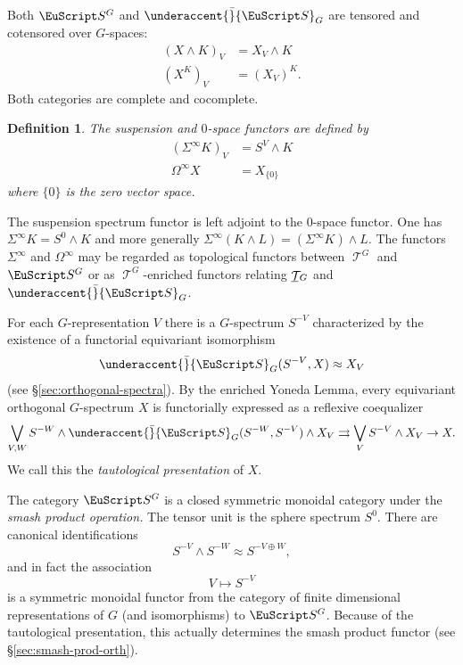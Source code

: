\documentclass{amsart}
\newtheorem{definition}[equation]{Definition}
\newenvironment{defin}{\begin{definition}\rm}{\end{definition}}
\theoremstyle{definition}
\newtheorem{defin}[equation]{Definition}
\theoremstyle{remark}
\newcommand{\spectra}{\EuScript S}
\DeclareMathOperator{\spaces}{\mathcal T}
\newcommand{\gspaces}[1]{\underline{\spaces\mkern-4mu}\mkern4mu_{\!#1}}
\newcommand{\ugspaces}[1]{\spaces^{#1}}
\newcommand{\gspectra}[1]{\underaccent{\bar}{\spectra}_{#1}}
\newcommand{\ugspectra}[1]{\spectra^{#1}}
\begin{document}
Both $\ugspectra{G}$ and $\gspectra{G}$ are tensored and cotensored
over $G$-spaces:
\begin{align*}
(X\wedge K)_{V} &= X_{V}\wedge K \\
\left(X^{K} \right)_{V} &= (X_{V})^{K}.
\end{align*}
Both categories are complete and cocomplete.

\begin{defin}
\label{def:6} The {\em suspension} and {\em $0$-space} functors are
defined by
\begin{align*}
(\Sigma^{\infty}K)_{V} &=S^{V}\wedge K \\
\Omega^{\infty}X &= X_{\{0\}}
\end{align*}
where $\{0 \}$ is the zero vector space.
\end{defin}

The suspension spectrum functor is left adjoint to the $0$-space
functor.  One has $\Sigma^{\infty}K = S^{0}\wedge K$ and more
generally $\Sigma^{\infty}(K\wedge L) = \left(\Sigma^\infty
K\right)\wedge L$.  The functors $\Sigma^{\infty}$ and
$\Omega^{\infty}$ may be regarded as topological functors between
$\ugspaces{G}$ and $\ugspectra{G}$ or as $\ugspaces{G}$-enriched
functors relating $\gspaces{G}$ and $\gspectra{G}$.

For each $G$-representation $V$ there is a $G$-spectrum $S^{-V}$
characterized by the existence of a functorial equivariant isomorphism
\begin{equation}
\label{eq:167}
\gspectra{G}(S^{-V},X) \approx X_{V}
\end{equation}
(see \S\ref{sec:orthogonal-spectra}).  By the enriched Yoneda Lemma,
every equivariant orthogonal $G$-spectrum $X$ is functorially
expressed as a reflexive coequalizer
\begin{equation}
\bigvee_{V,W} S^{-W}\wedge \gspectra{G}(S^{-W},S^{-V})\wedge
X_{V}\rightrightarrows
\bigvee_{V} S^{-V}\wedge X_{V} \to X.
\end{equation}
We call this the {\em tautological presentation} of $X$.

The category $\ugspectra{G}$ is a closed symmetric monoidal category
under the {\em smash product operation.}  The tensor unit is the sphere
spectrum $S^{0}$.    
There are canonical identifications 
\[
S^{-V}\wedge S^{-W}\approx S^{-V\oplus W},
\]
and in fact the association 
\[
V\mapsto S^{-V}
\]
is a symmetric monoidal functor from the category of finite
dimensional representations of $G$ (and isomorphisms) to
$\ugspectra{G}$.  Because of the tautological presentation, this
actually determines the smash product functor (see
\S\ref{sec:smash-prod-orth}).
\end{document}
